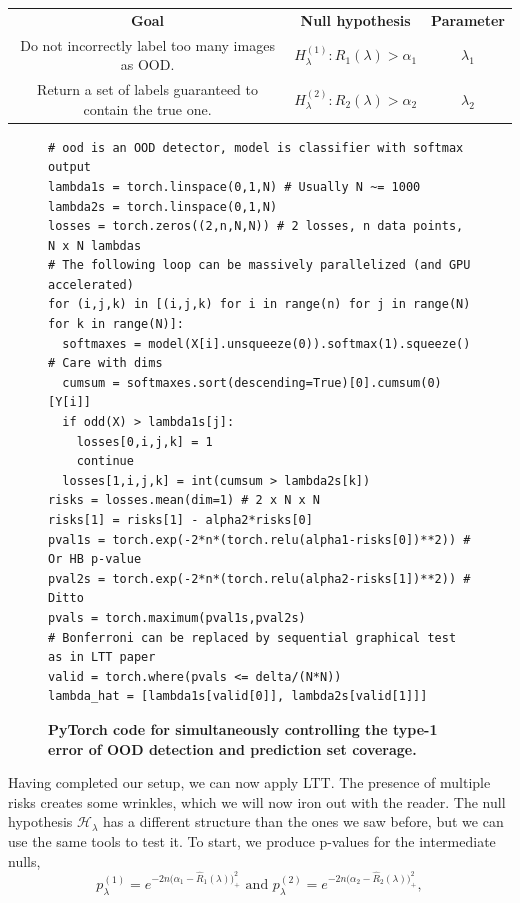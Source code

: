 \documentclass[10pt]{article}
\newcommand{\Rhat}{\widehat{R}}
\newcommand{\Hlam}{\mathcal{H}_ {\lambda}}
\begin{document}
\begin{table}[H]
    \centering
    \begin{tabular}{c|c|c}
        \textbf{Goal} & \textbf{Null hypothesis} & \textbf{Parameter} \\
        Do not incorrectly label too many images as OOD. & $H_{\lambda}^{(1)}: R_1(\lambda) > \alpha_1$ & $\lambda_1$ \\
        Return a set of labels guaranteed to contain the true one. & $H_{\lambda}^{(2)}: R_2(\lambda) > \alpha_2$ & $\lambda_2$
    \end{tabular}
\end{table}
\begin{figure}[t]
    \centering
    \begin{verbatim}
# ood is an OOD detector, model is classifier with softmax output
lambda1s = torch.linspace(0,1,N) # Usually N ~= 1000
lambda2s = torch.linspace(0,1,N)
losses = torch.zeros((2,n,N,N)) # 2 losses, n data points, N x N lambdas
# The following loop can be massively parallelized (and GPU accelerated)
for (i,j,k) in [(i,j,k) for i in range(n) for j in range(N) for k in range(N)]:
  softmaxes = model(X[i].unsqueeze(0)).softmax(1).squeeze() # Care with dims
  cumsum = softmaxes.sort(descending=True)[0].cumsum(0)[Y[i]]
  if odd(X) > lambda1s[j]:
    losses[0,i,j,k] = 1
    continue
  losses[1,i,j,k] = int(cumsum > lambda2s[k])
risks = losses.mean(dim=1) # 2 x N x N
risks[1] = risks[1] - alpha2*risks[0]
pval1s = torch.exp(-2*n*(torch.relu(alpha1-risks[0])**2)) # Or HB p-value
pval2s = torch.exp(-2*n*(torch.relu(alpha2-risks[1])**2)) # Ditto
pvals = torch.maximum(pval1s,pval2s)
# Bonferroni can be replaced by sequential graphical test as in LTT paper
valid = torch.where(pvals <= delta/(N*N))
lambda_hat = [lambda1s[valid[0]], lambda2s[valid[1]]]
    \end{verbatim}
    \caption{\textbf{PyTorch code for simultaneously controlling the type-1 error of OOD detection and prediction set coverage.}}
    \label{fig:ltt-ood-coverage-code}
\end{figure}
Having completed our setup, we can now apply LTT.
The presence of multiple risks creates some wrinkles, which we will now iron out with the reader.
The null hypothesis $\Hlam$ has a different structure than the ones we saw before, but we can use the same tools to test it.
To start, we produce p-values for the intermediate nulls,
\begin{equation}
    p_{\lambda}^{(1)} = e^{-2n\big(\alpha_1-\Rhat_1(\lambda)\big)_+^2}\text{ and }p_{\lambda}^{(2)} = e^{-2n\big(\alpha_2-\Rhat_2(\lambda)\big)_+^2},
\end{equation}
\end{document}

